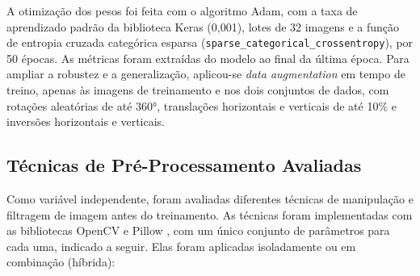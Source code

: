 A otimização dos pesos foi feita com o algoritmo Adam, com a taxa de aprendizado padrão da biblioteca Keras (0,001), lotes de 32 imagens e a função de entropia cruzada categórica esparsa (\texttt{sparse\_categorical\_crossentropy}), por 50 épocas. As métricas foram extraídas do modelo ao final da última época. Para ampliar a robustez e a generalização, aplicou-se \textit{data augmentation} em tempo de treino, apenas às imagens de treinamento e nos dois conjuntos de dados, com rotações aleatórias de até 360°, translações horizontais e verticais de até 10\% e inversões horizontais e verticais.

\subsection{Técnicas de Pré-Processamento Avaliadas}
Como variável independente, foram avaliadas diferentes técnicas de manipulação e filtragem de imagem antes do treinamento. As técnicas foram implementadas com as bibliotecas OpenCV \cite{bradski2000opencv} e Pillow \cite{clark2015pillow}, com um único conjunto de parâmetros para cada uma, indicado a seguir. Elas foram aplicadas isoladamente ou em combinação (híbrida):
